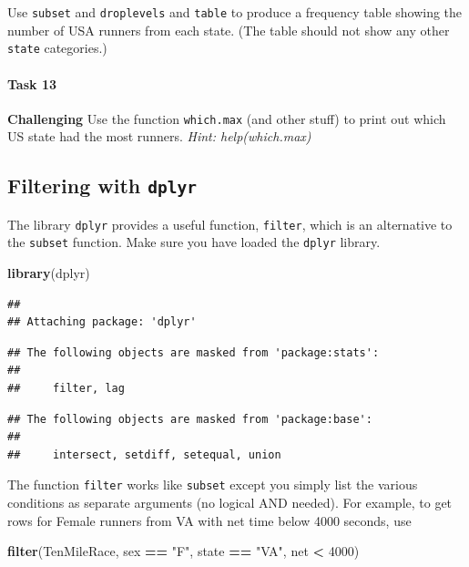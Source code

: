 \documentclass[
]{article}
\newenvironment{Shaded}{\begin{snugshade}}{\end{snugshade}}
\newcommand{\DecValTok}[1]{\textcolor[rgb]{0.00,0.00,0.81}{#1}}
\newcommand{\FunctionTok}[1]{\textcolor[rgb]{0.13,0.29,0.53}{\textbf{#1}}}
\newcommand{\NormalTok}[1]{#1}
\newcommand{\SpecialCharTok}[1]{\textcolor[rgb]{0.81,0.36,0.00}{\textbf{#1}}}
\newcommand{\StringTok}[1]{\textcolor[rgb]{0.31,0.60,0.02}{#1}}
\begin{document}
Use \texttt{subset} and \texttt{droplevels} and \texttt{table} to
produce a frequency table showing the number of USA runners from each
state. (The table should not show any other \texttt{state} categories.)

\paragraph{Task 13}\label{task-13}

\textbf{Challenging} Use the function \texttt{which.max} (and other
stuff) to print out which US state had the most runners. \emph{Hint:
help(which.max)}

\subsection{\texorpdfstring{Filtering with
\texttt{dplyr}}{Filtering with dplyr}}\label{filtering-with-dplyr}

The library \texttt{dplyr} provides a useful function, \texttt{filter},
which is an alternative to the \texttt{subset} function. Make sure you
have loaded the \texttt{dplyr} library.

\begin{Shaded}
\begin{Highlighting}[]
\FunctionTok{library}\NormalTok{(dplyr)}
\end{Highlighting}
\end{Shaded}

\begin{verbatim}
## 
## Attaching package: 'dplyr'
\end{verbatim}

\begin{verbatim}
## The following objects are masked from 'package:stats':
## 
##     filter, lag
\end{verbatim}

\begin{verbatim}
## The following objects are masked from 'package:base':
## 
##     intersect, setdiff, setequal, union
\end{verbatim}

The function \texttt{filter} works like \texttt{subset} except you
simply list the various conditions as separate arguments (no logical AND
needed). For example, to get rows for Female runners from VA with net
time below 4000 seconds, use

\begin{Shaded}
\begin{Highlighting}[]
\FunctionTok{filter}\NormalTok{(TenMileRace, sex }\SpecialCharTok{==} \StringTok{"F"}\NormalTok{, state }\SpecialCharTok{==} \StringTok{"VA"}\NormalTok{, net }\SpecialCharTok{\textless{}} \DecValTok{4000}\NormalTok{)}
\end{Highlighting}
\end{Shaded}
\end{document}
